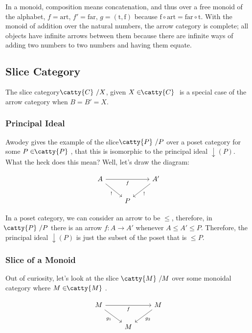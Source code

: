 \documentclass[]{article}
\newcommand{\cdrr}[1]{\arrow[swap]{rr}{#1}}
\newcommand{\cddl}[1]{\arrow{dl}{#1}}
\newcommand{\cddr}[1]{\arrow[swap]{dr}{#1}}
\newcommand{\tfarr}[4][\to]{\ensuremath{#2 : #3 #1 #4}}
\newcommand{\cat}[1]{\ensuremath{\!\! \catty{#1} \,\,}}
\begin{document}
In a monoid, composition means concatenation, and thus over a free monoid of the
alphabet, $f = \text{art}$, $f' = \text{far}$, $g = (\text{t}, \text{f})$
because $\text{f}\circ\text{art} = \text{far}\circ\text{t}$. With the monoid of
addition over the natural numbers, the arrow category is complete; all objects
have infinite arrows between them because there are infinite ways of adding two
numbers to two numbers and having them equate.



\subsection{Slice Category}

The slice category $\cat{C}/X$, given $X \in \cat{C}$ is a special case of the
arrow category when $B = B' = X$.

\subsubsection{Principal Ideal}

Awodey gives the example of the slice $\cat{P}/P$ over a poset category for some
$P \in \cat{P}$, that this is isomorphic to the principal ideal
$\downarrow\!(P)$. What the heck does this mean? Well, let's draw the diagram:

$$\begin{tikzcd}
  A \cdrr{f} \cddr{!} & & A' \cddl{!} \\
  & P &
\end{tikzcd}$$

In a poset category, we can consider an arrow to be $\le$, therefore, in
$\cat{P}/P$ there is an arrow $\tfarr{f}{A}{A'}$ whenever $A \le A' \le P$.
Therefore, the principal ideal $\downarrow\!(P)$ is just the subset of the poset
that is $\le P$.

\subsubsection{Slice of a Monoid}

Out of curiosity, let's look at the slice $\;\cat{M}/M$ over some monoidal
category where $M \in \cat{M}$.

$$\begin{tikzcd}
  M \cdrr{f} \cddr{g_1} & & M \cddl{g_2} \\
  & M &
\end{tikzcd}$$
\end{document}
